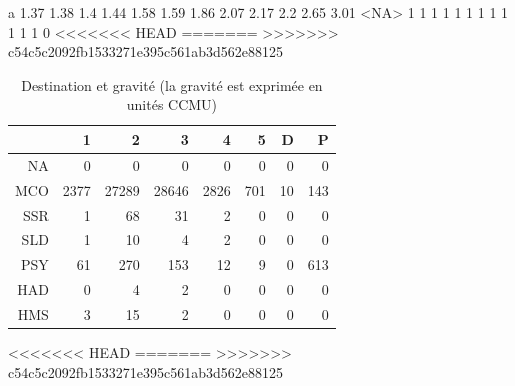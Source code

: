 \documentclass[12pt,english,french,twoside]{book}\usepackage[]{graphicx}\usepackage[]{color}
\makeatletter
\newenvironment{kframe}{%
 \def\at@end@of@kframe{}%
 \ifinner\ifhmode%
  \def\at@end@of@kframe{\end{minipage}}%
  \begin{minipage}{\columnwidth}%
 \fi\fi%
 \def\FrameCommand##1{\hskip\@totalleftmargin \hskip-\fboxsep
 \colorbox{shadecolor}{##1}\hskip-\fboxsep
     \hskip-\linewidth \hskip-\@totalleftmargin \hskip\columnwidth}%
 \MakeFramed {\advance\hsize-\width
   \@totalleftmargin\z@ \linewidth\hsize
   \@setminipage}}%
 {\par\unskip\endMakeFramed%
 \at@end@of@kframe}
\makeatother
\begin{document}
\begin{kframe}


{\ttfamily\noindent\bfseries{}}\end{kframe}a
1.37 1.38  1.4 1.44 1.58 1.59 1.86 2.07 2.17  2.2 2.65 3.01 <NA> 
   1    1    1    1    1    1    1    1    1    1    1    1    0 
<<<<<<< HEAD
=======
>>>>>>> c54c5c2092fb1533271e395c561ab3d562e88125
\begin{table}[ht]
\centering
\begin{tabular}{rrrrrrrr}
  \hline
 & 1 & 2 & 3 & 4 & 5 & D & P \\ 
  \hline
NA &   0 &   0 &   0 &   0 &   0 &   0 &   0 \\ 
  MCO & 2377 & 27289 & 28646 & 2826 & 701 &  10 & 143 \\ 
  SSR &   1 &  68 &  31 &   2 &   0 &   0 &   0 \\ 
  SLD &   1 &  10 &   4 &   2 &   0 &   0 &   0 \\ 
  PSY &  61 & 270 & 153 &  12 &   9 &   0 & 613 \\ 
  HAD &   0 &   4 &   2 &   0 &   0 &   0 &   0 \\ 
  HMS &   3 &  15 &   2 &   0 &   0 &   0 &   0 \\ 
   \hline
\end{tabular}
\caption[Destination et gravité]{Destination et gravité (la gravité est exprimée en unités CCMU)} 
\label{tab:dest_gravite}
\end{table}
<<<<<<< HEAD
=======
>>>>>>> c54c5c2092fb1533271e395c561ab3d562e88125
\end{document}
